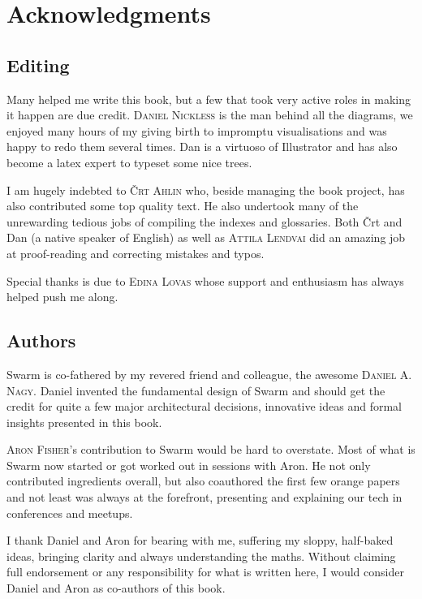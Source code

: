 \newcommand{\person}[1]{{\scshape #1}}
\chapter{Acknowledgments \statusgreen}

\section*{Editing}

Many helped me write this book, but a few that took very active roles in making it happen are due credit. \person{Daniel Nickless} is the man behind all the diagrams, we enjoyed many hours of my giving birth to impromptu visualisations and was happy to redo them several times. Dan is a virtuoso of Illustrator and has also become a latex expert to typeset some nice trees. 

I am hugely indebted to \person{Črt Ahlin} who, beside managing the book project, has also contributed some top quality text.
He also undertook many of the unrewarding tedious jobs of compiling the indexes and glossaries. Both Črt and Dan (a native speaker of English) as well as \person{Attila Lendvai} did an amazing job at proof-reading and correcting mistakes and typos.

Special thanks is due to \person{Edina Lovas} whose support and enthusiasm has always helped push me along. 

\section*{Authors}

Swarm is co-fathered by my revered friend and colleague, the awesome \person{Daniel A. Nagy}.  Daniel invented the fundamental design of Swarm and should get the credit for quite a few major architectural decisions, innovative ideas and formal insights presented in this book. 

\person{Aron Fisher}'s contribution to Swarm would be hard to overstate. Most of what is Swarm now started or got worked out in sessions with Aron.  He not only contributed ingredients overall, but also coauthored the first few orange papers and not least was always at the forefront, presenting and explaining our tech in conferences and meetups.

I thank Daniel and Aron for bearing with me, suffering my sloppy, half-baked ideas, bringing clarity and always understanding the maths.
Without claiming full endorsement or any responsibility for what is written here,
I would consider Daniel and Aron as co-authors of this book.

